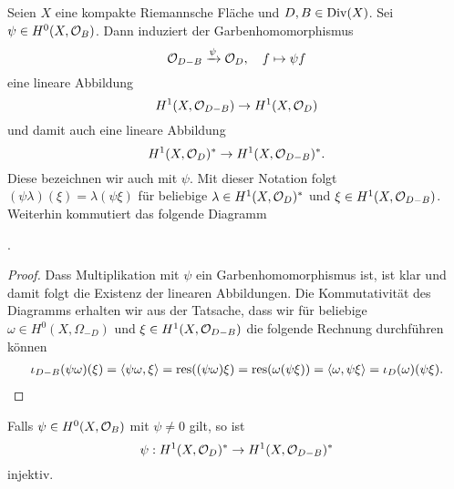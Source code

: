 \begin{lemma}
  Seien $X$ eine kompakte Riemannsche Fläche und $D,B \in \operatorname{Div}(X)$.
  Sei \break $\psi \in H^0(X,\mathcal{O}_B)$. Dann induziert der
  Garbenhomomorphismus
  \[
  \mathcal{O}_{D-B} \xrightarrow{\psi} \mathcal{O}_D, \quad f \mapsto \psi f
  \] 
  eine lineare Abbildung
  \[
  H^1(X, \mathcal{O}_{D-B}) \rightarrow H^1(X, \mathcal{O}_D)
  \]
  und damit auch eine lineare Abbildung
  \[
  H^1(X, \mathcal{O}_D)^\ast \rightarrow H^1(X, \mathcal{O}_{D-B})^\ast.
  \]
  Diese bezeichnen wir auch mit $\psi$. Mit dieser Notation folgt
  $(\psi \lambda)(\xi) = \lambda(\psi \xi)$ für beliebige $\lambda \in
  H^1(X, \mathcal{O}_D)^\ast$ und $\xi \in H^1(X, \mathcal{O}_{D-B})$. Weiterhin
  kommutiert das folgende Diagramm
  \begin{center}
    .
  \end{center}
\end{lemma}

\begin{proof}
  Dass Multiplikation mit $\psi$ ein Garbenhomomorphismus ist, ist klar
  und damit folgt die Existenz der linearen Abbildungen. Die
  Kommutativität des Diagramms erhalten wir aus der Tatsache, dass wir
  für beliebige $\omega \in H^0(X, \Omega_{-D})$ und $\xi \in H^1(X,
  \mathcal{O}_{D-B})$ die folgende Rechnung durchführen können
  \begin{align*}
    \iota_{D-B}(\psi \omega)(\xi) = \langle \psi \omega, \xi \rangle = \operatorname{res}((\psi
    \omega) \xi) = \operatorname{res}(\omega (\psi \xi)) = \langle \omega, \psi \xi \rangle =
    \iota_D(\omega)(\psi \xi).
  \end{align*}
\end{proof}

\begin{lemma}
  \label{lemma:psi-inj}
  Falls $\psi \in H^0(X, \mathcal{O}_B)$ mit $\psi \neq 0$ gilt, so ist
  \[
  \psi: H^1(X, \mathcal{O}_D)^\ast \rightarrow H^1(X, \mathcal{O}_{D-B})^\ast
  \]
  injektiv.
\end{lemma}

